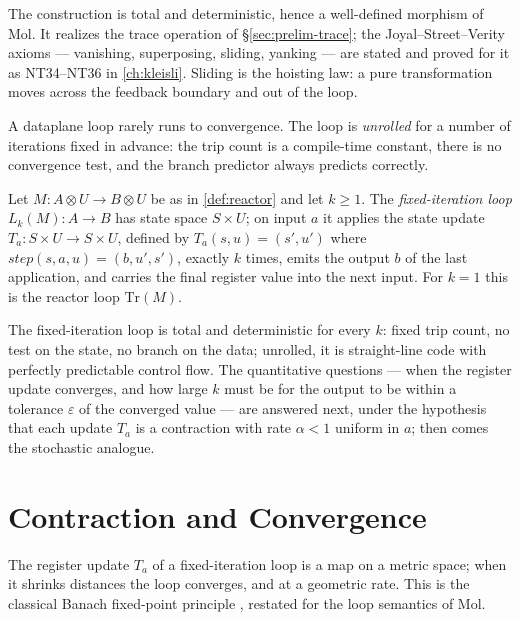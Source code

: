 \begin{remark}
The construction is total and deterministic, hence a well-defined morphism of Mol. It realizes the trace operation of \S\ref{sec:prelim-trace}; the Joyal--Street--Verity axioms \citep{joyalsv} --- vanishing, superposing, sliding, yanking --- are stated and proved for it as NT34--NT36 in \autoref{ch:kleisli}. Sliding is the hoisting law: a pure transformation moves across the feedback boundary and out of the loop.
\end{remark}

A dataplane loop rarely runs to convergence. The loop is \emph{unrolled} for a number of iterations fixed in advance: the trip count is a compile-time constant, there is no convergence test, and the branch predictor always predicts correctly.

\begin{definition}\label{def:fixed-loop}
Let $M \colon A \otimes U \to B \otimes U$ be as in \autoref{def:reactor} and let $k \geq 1$. The \emph{fixed-iteration loop} $L_k(M) \colon A \to B$ has state space $S \times U$; on input $a$ it applies the state update $T_a \colon S \times U \to S \times U$, defined by $T_a(s,u) = (s',u')$ where $\mathit{step}(s,a,u) = (b,u',s')$, exactly $k$ times, emits the output $b$ of the last application, and carries the final register value into the next input. For $k = 1$ this is the reactor loop $\mathrm{Tr}(M)$.
\end{definition}

\begin{remark}
The fixed-iteration loop is total and deterministic for every $k$: fixed trip count, no test on the state, no branch on the data; unrolled, it is straight-line code with perfectly predictable control flow. The quantitative questions --- when the register update converges, and how large $k$ must be for the output to be within a tolerance $\varepsilon$ of the converged value --- are answered next, under the hypothesis that each update $T_a$ is a contraction with rate $\alpha < 1$ uniform in $a$; then comes the stochastic analogue.
\end{remark}

\section{Contraction and Convergence}\label{sec:trace-contraction}

The register update $T_a$ of a fixed-iteration loop is a map on a metric space; when it shrinks distances the loop converges, and at a geometric rate. This is the classical Banach fixed-point principle \citep{banach}, restated for the loop semantics of Mol.

